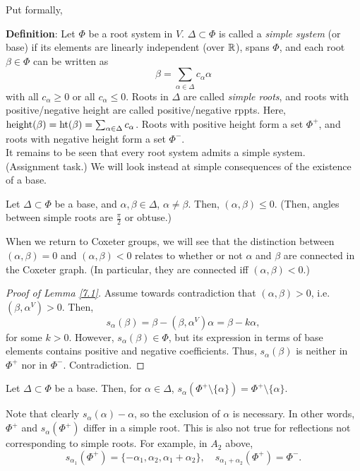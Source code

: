 Put formally,

{\bf Definition}:
Let $\Phi$ be a root system in $V$. $\Delta \subset \Phi$ is called a {\em
simple system} (or base) if its elements are linearly independent (over $\mathbb{R}$),
spans $\Phi$, and each root $\beta \in \Phi$ can be written as
\[
    \beta = \sum_{\alpha \in \Delta} c_\alpha \alpha
\]
with all $c_\alpha \geq 0$ or all $c_\alpha \leq 0$. Roots in $\Delta$ are
called {\em simple roots}, and roots with positive/negative height are called
positive/negative rppts. Here,
${\rm height}(\beta)= {\rm ht}(\beta) = \sum_{\alpha \in \Delta} c_\alpha$.
Roots with positive height form a set $\Phi^+$, and roots with negative height
form a set $\Phi^-$.
\\

It remains to be seen that every root system admits a simple system. (Assignment
task.) We will look instead at simple consequences of the existence of a base.

\begin{lemma} \label{7.1}
Let $\Delta \subset \Phi$ be a base, and $\alpha, \beta \in \Delta$, $\alpha
\neq \beta$. Then, $(\alpha, \beta) \leq 0$. (Then, angles between simple roots
are $\frac{\pi}{2}$ or obtuse.)
\end{lemma}

When we return to Coxeter groups, we will see that the distinction between
$(\alpha, \beta) = 0$ and $(\alpha, \beta) < 0$ relates to whether or not
$\alpha$ and $\beta$ are connected in the Coxeter graph. (In particular, they
are connected iff $(\alpha, \beta) < 0$.)

\begin{proof}[Proof of Lemma \ref{7.1}]
Assume towards contradiction that $(\alpha, \beta) > 0$, i.e.
$(\beta, \alpha^V) > 0$. Then,
\[
    s_\alpha(\beta) = \beta - (\beta, \alpha^V) \alpha = \beta - k\alpha,
\]
for some $k > 0$. However, $s_\alpha(\beta) \in \Phi$, but its expression in
terms of base elements contains positive and negative coefficients. Thus,
$s_\alpha(\beta)$ is neither in $\Phi^+$ nor in $\Phi^-$. Contradiction.
\end{proof}

\begin{lemma} \label{7.2} %
Let $\Delta \subset \Phi$ be a base. Then, for $\alpha \in \Delta$,
$s_\alpha(\Phi^+ \setminus \{\alpha\}) = \Phi^+ \setminus \{\alpha\}$.
\end{lemma}

Note that clearly $s_\alpha(\alpha) - \alpha$, so the exclusion of $\alpha$ is
necessary. In other words, $\Phi^+$ and $s_\alpha(\Phi^+)$ differ in a simple
root. This is also not true for reflections not corresponding to simple roots.
For example, in $A_2$ above,
\[
    s_{\alpha_1}(\Phi^+) = \{-\alpha_1, \alpha_2, \alpha_1 + \alpha_2\},
    \quad
    s_{\alpha_1 + \alpha_2}(\Phi^+) = \Phi^-.
\]

